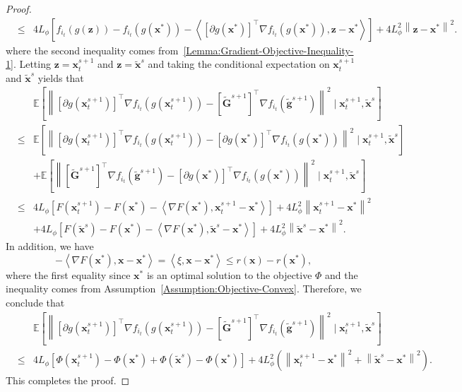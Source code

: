 \documentclass[11pt]{article}
\newcommand{\BE}{\mathbb{E}}
\newcommand{\x}{\mathbf x}
\newcommand{\z}{\mathbf z}
\newcommand{\g}{\mathbf g}
\newcommand{\G}{\mathbf G}
\begin{document}
\begin{proof}
\begin{eqnarray*}
& \leq & 4L_\phi\left[f_{i_t}(g(\z)) - f_{i_t}(g(\x^*)) - \left\langle\left[\partial g(\x^*)\right]^\top\nabla f_{i_t}(g(\x^*)), \z-\x^*\right\rangle\right] + 4L_\phi^2\left\|\z-\x^*\right\|^2.
\end{eqnarray*}
where the second inequality comes from~\eqref{Lemma:Gradient-Objective-Inequality-1}. Letting $\z=\x_t^{s+1}$ and $\z=\tilde{\x}^s$ and taking the conditional expectation on $\x_t^{s+1}$ and $\tilde{\x}^s$ yields that 
\begin{eqnarray*}
& & \BE\left[\left\| \left[\partial g(\x_t^{s+1})\right]^\top\nabla f_{i_t}(g(\x_t^{s+1})) - \left[\tilde{\G}^{s+1}\right]^\top \nabla f_{i_t}(\tilde{\g}^{s+1})\right\|^2 \mid \x_t^{s+1}, \tilde{\x}^s\right] \\
& \leq & \BE\left[\left\| \left[\partial g(\x_t^{s+1})\right]^\top\nabla f_{i_t}(g(\x_t^{s+1})) - \left[\partial g(\x^*)\right]^\top\nabla f_{i_t}(g(\x^*)) \right\|^2 \mid \x_t^{s+1}, \tilde{\x}^s\right] \\
& & + \BE\left[\left\| \left[\tilde{\G}^{s+1}\right]^\top \nabla f_{i_t}(\tilde{\g}^{s+1}) - \left[\partial g(\x^*)\right]^\top\nabla f_{i_t}(g(\x^*)) \right\|^2 \mid \x_t^{s+1}, \tilde{\x}^s\right] \\
& \leq & 4L_\phi\left[F(\x_t^{s+1}) - F(\x^*) - \left\langle\nabla F(\x^*), \x_t^{s+1}-\x^*\right\rangle\right] + 4L_\phi^2\left\|\x_t^{s+1}-\x^*\right\|^2 \\
& & + 4L_\phi\left[F(\tilde{\x}^s) - F(\x^*) - \left\langle\nabla F(\x^*), \tilde{\x}^s-\x^*\right\rangle\right] + 4L_\phi^2\left\|\tilde{\x}^s-\x^*\right\|^2.
\end{eqnarray*}
In addition, we have
\begin{equation*}
- \left\langle\nabla F(\x^*), \x-\x^*\right\rangle = \left\langle\xi,  \x-\x^*\right\rangle \leq r(\x) - r(\x^*), 
\end{equation*}
where the first equality since $\x^*$ is an optimal solution to the objective $\Phi$ and the inequality comes from Assumption~\ref{Assumption:Objective-Convex}. Therefore, we conclude that 
\begin{eqnarray*}
& & \BE\left[\left\| \left[\partial g(\x_t^{s+1})\right]^\top\nabla f_{i_t}(g(\x_t^{s+1})) - \left[\tilde{\G}^{s+1}\right]^\top \nabla f_{i_t}(\tilde{\g}^{s+1})\right\|^2 \mid \x_t^{s+1}, \tilde{\x}^s\right] \\
& \leq & 4L_\phi\left[\Phi(\x_t^{s+1}) - \Phi(\x^*) + \Phi(\tilde{\x}^s) - \Phi(\x^*)\right] + 4L_\phi^2 \left(\left\|\x_t^{s+1}-\x^*\right\|^2 + \left\|\tilde{\x}^s-\x^*\right\|^2\right).
\end{eqnarray*}
This completes the proof. 
\end{proof}
\end{document}
